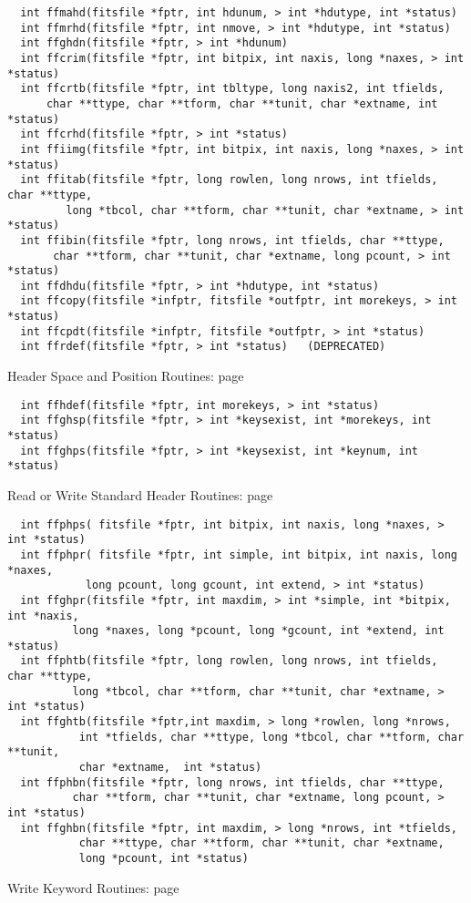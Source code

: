\begin{verbatim}
  int ffmahd(fitsfile *fptr, int hdunum, > int *hdutype, int *status)
  int ffmrhd(fitsfile *fptr, int nmove, > int *hdutype, int *status)
  int ffghdn(fitsfile *fptr, > int *hdunum)
  int ffcrim(fitsfile *fptr, int bitpix, int naxis, long *naxes, > int *status)
  int ffcrtb(fitsfile *fptr, int tbltype, long naxis2, int tfields,
      char **ttype, char **tform, char **tunit, char *extname, int *status)
  int ffcrhd(fitsfile *fptr, > int *status)
  int ffiimg(fitsfile *fptr, int bitpix, int naxis, long *naxes, > int *status)
  int ffitab(fitsfile *fptr, long rowlen, long nrows, int tfields, char **ttype,
         long *tbcol, char **tform, char **tunit, char *extname, > int *status)
  int ffibin(fitsfile *fptr, long nrows, int tfields, char **ttype,
       char **tform, char **tunit, char *extname, long pcount, > int *status)
  int ffdhdu(fitsfile *fptr, > int *hdutype, int *status)
  int ffcopy(fitsfile *infptr, fitsfile *outfptr, int morekeys, > int *status)
  int ffcpdt(fitsfile *infptr, fitsfile *outfptr, > int *status)
  int ffrdef(fitsfile *fptr, > int *status)   (DEPRECATED)
\end{verbatim}
 Header Space and Position Routines: page~\pageref{FFHDEF}

\begin{verbatim}
  int ffhdef(fitsfile *fptr, int morekeys, > int *status)
  int ffghsp(fitsfile *fptr, > int *keysexist, int *morekeys, int *status)
  int ffghps(fitsfile *fptr, > int *keysexist, int *keynum, int *status)
\end{verbatim}
 Read or Write Standard Header Routines: page~\pageref{FFPHPS}

\begin{verbatim}
  int ffphps( fitsfile *fptr, int bitpix, int naxis, long *naxes, > int *status)
  int ffphpr( fitsfile *fptr, int simple, int bitpix, int naxis, long *naxes,
            long pcount, long gcount, int extend, > int *status)
  int ffghpr(fitsfile *fptr, int maxdim, > int *simple, int *bitpix, int *naxis,
          long *naxes, long *pcount, long *gcount, int *extend, int *status)
  int ffphtb(fitsfile *fptr, long rowlen, long nrows, int tfields, char **ttype,
          long *tbcol, char **tform, char **tunit, char *extname, > int *status)
  int ffghtb(fitsfile *fptr,int maxdim, > long *rowlen, long *nrows,
           int *tfields, char **ttype, long *tbcol, char **tform, char **tunit,
           char *extname,  int *status)
  int ffphbn(fitsfile *fptr, long nrows, int tfields, char **ttype,
          char **tform, char **tunit, char *extname, long pcount, > int *status)
  int ffghbn(fitsfile *fptr, int maxdim, > long *nrows, int *tfields,
           char **ttype, char **tform, char **tunit, char *extname,
           long *pcount, int *status)
\end{verbatim}
 Write Keyword Routines: page~\pageref{FFPREC}

